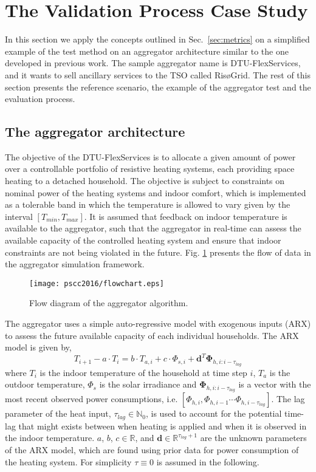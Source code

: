 \section{The Validation Process Case Study}

In this section we apply the concepts outlined in Sec.~\ref{sec:metrics} on a simplified example of the test method on an aggregator architecture similar to the one developed in previous work. The sample aggregator name is  DTU-FlexServices, and it wants to sell ancillary services to the TSO called RisøGrid. The rest of this section presents the reference scenario, the example of the aggregator test and the evaluation process. 

\subsection{The aggregator architecture}
The objective of the DTU-FlexServices is to allocate a given amount of power over a controllable portfolio of resistive heating systems, each providing space heating to a detached household. The objective is subject to constraints on nominal power of the heating systems and indoor comfort, which is implemented as a tolerable band in which the temperature is allowed to vary given by the interval $\left[T_{min},T_{max}\right]$. It is assumed that feedback on indoor temperature is available to the aggregator, such that the aggregator in real-time can assess the available capacity of the controlled heating system and ensure that indoor constraints are not being violated in the future. Fig. \ref{fig:flow_diagram} presents the flow of data in the aggregator simulation framework. 
\begin{figure}[!t]
\centering
\texttt{[image: pscc2016/flowchart.eps]}
\caption{Flow diagram of the aggregator algorithm.}
\label{fig:flow_diagram}
\end{figure}
The aggregator uses a simple auto-regressive model with exogenous inputs (ARX) to assess the future available capacity of each individual households. The ARX model is given by,
\begin{equation}\label{eq:capacity}
  T_{i+1} - a\cdot T_i = b \cdot T_{a,i} + c \cdot \Phi_{s,i} + \boldsymbol{d}^T \boldsymbol{\Phi}_{h,i:i-\tau_{lag}}
\end{equation} 
where $T_i$ is the indoor temperature of the household at time step $i$, $T_a$ is the outdoor temperature, $\Phi_s$ is the solar irradiance and $\boldsymbol{\Phi}_{h,i:i-\tau_{lag}}$ is a vector with the most recent observed power consumptions, i.e. $\left[\Phi_{h,i},\Phi_{h,i-1} \cdots \Phi_{h,i-\tau_{lag}}\right]$. The lag parameter of the heat input, $\tau_{lag}\in\mathbb{N}_0$, is used to account for the potential time-lag that might exists between when heating is applied and when it is observed in the indoor temperature. $a$, $b$, $c\in\mathbb{R}$, and $\boldsymbol{d}\in\mathbb{R}^{\tau_{lag}+1}$ are the unknown parameters of the ARX model, which are found using prior data for power consumption of the heating system. For simplicity $\tau\equiv 0$ is assumed in the following. 


